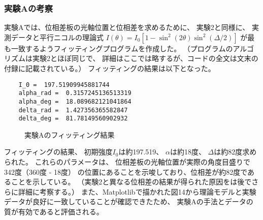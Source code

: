 \documentclass{article}
\begin{document}
\subsubsection*{実験Aの考察}
\begin{spacing}{1.2}
    実験Aでは、位相差板の光軸位置と位相差を求めるために、
    実験2と同様に、
    実測データと平行ニコルの理論式
    $I(\theta) = I_0 \left[ 1 - \sin^2(2\theta) \sin^2\left(\Delta / 2\right) \right]$
    が最も一致するようフィッティングプログラムを作成した。
    （プログラムのアルゴリズムは実験2とほぼ同じで、
    詳細はここでは略するが、コードの全文は文末の付録に記載されている。）
    フィッティングの結果は以下となった。
    \begin{lstlisting}
    I_0 =  197.51909945881744
    alpha_rad =  0.3157245136513319
    alpha_deg =  18.089682121041864
    delta_rad =  1.427356365582847
    delta_deg =  81.78149560902932
    \end{lstlisting}
    \begin{figure}[!htb] %
        \centering
        \caption{実験Aのフィッティング結果}
        \label{fig:14}
    \end{figure}
    \indent
    フィッティングの結果、
    初期強度$I_0$は約197.519、
    $\alpha$は約18度、
    $\Delta$は約82度求められた。
    これらのパラメータは、
    位相差板の光軸位置が実際の角度目盛りで342度（360度 - 18度）
    の位置にあることを示唆しており、位相差が約82度であることを示している。
    （実験2と異なる位相差の結果が得られた原因をは後でさらに詳細に考察する。）
    また、Matplotlibで描かれた図14から理論モデルと実験データが良好に一致していることが確認できたため、
    実験Aの手法とデータの質が有効であると評価される。
\end{spacing}
\end{document}
